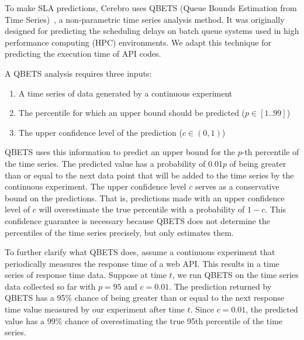 To make SLA predictions, Cerebro uses QBETS (Queue Bounds Estimation from Time Series)~\cite{Nurmi:2007:QQB:1791551.1791556},
a non-parametric time series analysis method.
It was originally designed for
predicting the scheduling delays on batch queue systems used in high performance computing (HPC) environments. 
We adapt this technique for predicting the execution time of API codes.

A QBETS analysis requires three inputs:
\begin{enumerate}
\item A time series of data generated by a continuous experiment
\item The percentile for which an upper bound should be predicted ($p \in [1..99]$)
\item The upper confidence level of the prediction ($c \in (0,1)$)
\end{enumerate}

QBETS uses this information to predict an upper bound for the $p$-th percentile of the time series.
The predicted value has a probability of $0.01p$ of being greater than or equal to the next data point that
will be added to the time series by the continuous experiment. 
The upper confidence level $c$ serves as a conservative
bound on the predictions. That is, predictions made with an upper confidence level of $c$ will overestimate
the true percentile with a probability of $1-c$. This confidence guarantee is necessary because 
QBETS does not determine the 
percentiles of the time series precisely, but only estimates them. 

To further clarify what QBETS does, assume a continuous experiment that periodically measures the
response time of a web API. This results in a time series of response time data. Suppose at time $t$,
we run QBETS on the time series data collected so far with $p=95$ and $c=0.01$. The prediction returned
by QBETS has a 95\% chance of being greater than or equal to the next response time value measured
by our experiment after time $t$. Since $c=0.01$, the predicted value has a 99\% chance of
overestimating the true 95th percentile of the time series.

